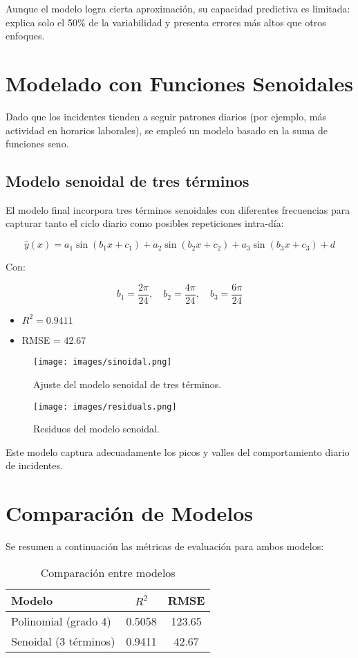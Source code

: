 \documentclass[a4paper,12pt]{article}
\begin{document}
Aunque el modelo logra cierta aproximación, su capacidad predictiva es limitada: explica solo el 50\% de la variabilidad y presenta errores más altos que otros enfoques.

\section{Modelado con Funciones Senoidales}

Dado que los incidentes tienden a seguir patrones diarios (por ejemplo, más actividad en horarios laborales), se empleó un modelo basado en la suma de funciones seno.

\subsection{Modelo senoidal de tres términos}

El modelo final incorpora tres términos senoidales con diferentes frecuencias para capturar tanto el ciclo diario como posibles repeticiones intra-día:

\[
\hat{y}(x) = a_1 \sin(b_1 x + c_1) + a_2 \sin(b_2 x + c_2) + a_3 \sin(b_3 x + c_3) + d
\]

Con:

\[
b_1 = \frac{2\pi}{24}, \quad b_2 = \frac{4\pi}{24}, \quad b_3 = \frac{6\pi}{24}
\]

\begin{itemize}
    \item \( R^2 = 0.9411 \)
    \item RMSE = 42.67
\end{itemize}

\begin{figure}[H]
    \centering
    \texttt{[image: images/sinoidal.png]}
    \caption{Ajuste del modelo senoidal de tres términos.}
\end{figure}

\begin{figure}[H]
    \centering
    \texttt{[image: images/residuals.png]}
    \caption{Residuos del modelo senoidal.}
\end{figure}

Este modelo captura adecuadamente los picos y valles del comportamiento diario de incidentes.

\section{Comparación de Modelos}

Se resumen a continuación las métricas de evaluación para ambos modelos:

\begin{table}[H]
    \centering
    \begin{tabular}{lcc}
        \toprule
        \textbf{Modelo} & \textbf{\( R^2 \)} & \textbf{RMSE} \\
        \midrule
        Polinomial (grado 4) & 0.5058 & 123.65 \\
        Senoidal (3 términos) & 0.9411 & 42.67 \\
        \bottomrule
    \end{tabular}
    \caption{Comparación entre modelos}
\end{table}
\end{document}
